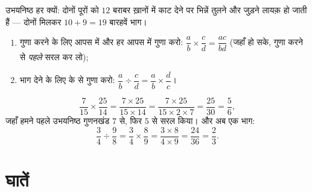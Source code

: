 \begin{omfigure}

{\small उभयनिष्ठ हर क्यों: दोनों पूरों को $12$ बराबर ख़ानों में काट
देने पर भिन्नें तुलने और जुड़ने लायक़ हो जाती हैं --- दोनों मिलकर
$10 + 9 = 19$ बारहवें भाग।}
\end{omfigure}

\begin{method}[भिन्नों का गुणा और भाग]\label{met:g9:fractions:mult}
\begin{enumerate}
  \item गुणा करने के लिए  आपस में और हर आपस में गुणा करो:
        $\dfrac ab \times \dfrac cd = \dfrac{ac}{bd}$ (जहाँ हो सके,
        गुणा करने से \emph{पहले} सरल कर लो);
  \item भाग देने के लिए  के  से गुणा करो:
        $\dfrac ab \div \dfrac cd = \dfrac ab \times \dfrac dc$।
\end{enumerate}
\end{method}

\begin{example}\label{ex:g9:fractions:mult}
\[
\frac{7}{15} \times \frac{25}{14}
= \frac{7 \times 25}{15 \times 14}
= \frac{7 \times 25}{15 \times 2 \times 7}
= \frac{25}{30} = \frac56,
\]
जहाँ हमने पहले उभयनिष्ठ गुणनखंड $7$ से, फिर $5$ से सरल किया। और अब
एक भाग:
\[
\frac{3}{4} \div \frac{9}{8}
= \frac34 \times \frac89
= \frac{3 \times 8}{4 \times 9}
= \frac{24}{36} = \frac23 .
\]
\end{example}

\section{घातें}

